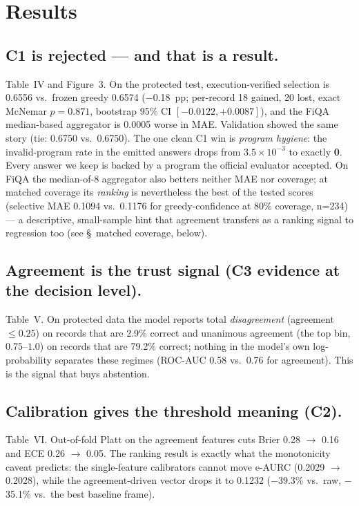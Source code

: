 \documentclass[conference]{IEEEtran}
\begin{document}
\section{Results}\label{sec:results}
\subsection{C1 is rejected --- and that is a result.}
Table~IV and Figure~3. On the protected test, execution-verified selection is 0.6556 vs.\
frozen greedy 0.6574 ($-$0.18~pp; per-record 18 gained, 20 lost, exact McNemar $p=0.871$,
bootstrap 95\% CI $[-0.0122,+0.0087]$), and the FiQA median-based
aggregator is 0.0005 worse in MAE. Validation showed the same story (tie: 0.6750 vs.\ 0.6750).
The one clean C1 win is \emph{program hygiene}: the invalid-program rate in the emitted
answers drops from $3.5\times10^{-3}$ to exactly \textbf{0}. Every answer we keep is backed
by a program the official evaluator accepted. On FiQA the median-of-8 aggregator also
betters neither MAE nor coverage; at matched coverage its \emph{ranking} is nevertheless the
best of the tested scores (selective MAE 0.1094 vs.\ 0.1176 for greedy-confidence at 80\%
coverage, n=234) --- a descriptive, small-sample hint that agreement transfers as a ranking
signal to regression too (see \S~matched coverage, below).

\subsection{Agreement is the trust signal (C3 evidence at the decision level).}
Table~V. On protected data the model reports total
\emph{disagreement} (agreement $\le 0.25$) on records that are 2.9\% correct and unanimous
agreement (the top bin, $0.75$--$1.0$) on records that are 79.2\% correct; nothing in the
model's own log-probability separates these regimes (ROC-AUC 0.58 vs.\ 0.76 for agreement).
This is the signal that buys abstention.

\subsection{Calibration gives the threshold meaning (C2).}
Table~VI. Out-of-fold Platt on the agreement features cuts Brier 0.28
$\rightarrow$ 0.16 and ECE 0.26 $\rightarrow$ 0.05. The ranking result is exactly what the
monotonicity caveat predicts: the single-feature calibrators cannot move e-AURC
(0.2029 $\rightarrow$ 0.2028), while the agreement-driven vector drops it to 0.1232
($-$39.3\% vs.\ raw, $-$35.1\% vs.\ the best baseline frame).
\end{document}
